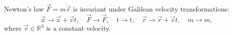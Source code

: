 Newton's law $\vec{F} = m \ddot{\vec{r}}$ is invariant under Galilean velocity transformations:
$$\vec{x} \to \vec{x} + \vec{v}t, \quad \vec{F} \to \vec{F}, \quad t \to t, \quad \vec{r} \to \vec{r} + \vec{v}t, \quad m \to m,$$
where $\vec{v} \in \mathbb{R}^3$ is a constant velocity.